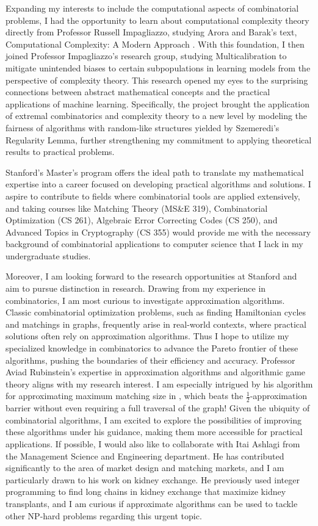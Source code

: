 \documentclass[12pt]{article}
\begin{document}
Expanding my interests to include the computational aspects of combinatorial problems, I had the
opportunity to learn about computational complexity theory directly from Professor Russell
Impagliazzo, studying Arora and Barak's text, Computational Complexity: A Modern Approach
\cite{arora2009computational}. With this foundation, I then joined Professor Impagliazzo's research
group, studying Multicalibration to mitigate unintended biases to certain subpopulations in learning
models from the perspective of complexity theory. This research opened my eyes to the surprising
connections between abstract mathematical concepts and the practical applications of machine
learning. Specifically, the project brought the application of extremal combinatorics and complexity
theory to a new level by modeling the fairness of algorithms with random-like structures yielded
by Szemeredi's Regularity Lemma, further strengthening my commitment to applying theoretical results
to practical problems.

Stanford's Master's program offers the ideal path to translate my mathematical expertise into a
career focused on developing practical algorithms and solutions. I aspire to contribute to fields
where combinatorial tools are applied extensively, and taking courses like Matching Theory (MS\&E
319), Combinatorial Optimization (CS 261), Algebraic Error Correcting Codes (CS 250), and Advanced
Topics in Cryptography (CS 355) would provide me with the necessary background of combinatorial
applications to computer science that I lack in my undergraduate studies.

Moreover, I am looking forward to the research opportunities at Stanford and aim to pursue
distinction in research. Drawing from my experience in combinatorics, I am most curious to
investigate approximation algorithms. Classic combinatorial optimization problems, such as finding
Hamiltonian cycles and matchings in graphs, frequently arise in real-world contexts, where practical
solutions often rely on approximation algorithms. Thus I hope to utilize my specialized knowledge in
combinatorics to advance the Pareto frontier of these algorithms, pushing the boundaries of their
efficiency and accuracy. Professor Aviad Rubinstein's expertise in approximation algorithms and
algorithmic game theory aligns with my research interest. I am especially intrigued by his algorithm
for approximating maximum matching size in \cite{doi:10.1137/1.9781611977554.ch151}, which beats the
$\frac{1}{2}$-approximation barrier without even requiring a full traversal of the graph! Given the
ubiquity of combinatorial algorithms, I am excited to explore the possibilities of improving these
algorithms under his guidance, making them more accessible for practical applications. If possible,
I would also like to collaborate with Itai Ashlagi from the Management Science and Engineering
department. He has contributed significantly to the area of market design and matching markets, and
I am particularly drawn to his work on kidney exchange. He previously used integer programming to
find long chains in kidney exchange that maximize kidney
transplants\cite{doi:10.1073/pnas.1421853112}, and I am curious if approximate algorithms can be
used to tackle other NP-hard problems regarding this urgent topic.
\end{document}
